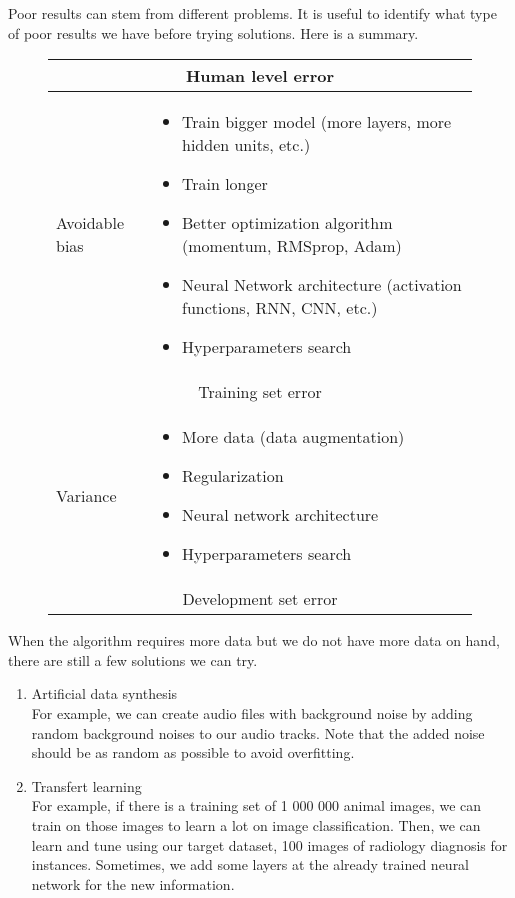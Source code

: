 Poor results can stem from different problems.
It is useful to identify what type of poor results we have before trying solutions.
Here is a summary.

\begin{figure}[h]
	\centering
	\renewcommand{\arraystretch}{1.5}
	\begin{tabular}{ll}
		\hline
		\multicolumn{2}{c}{Human level error} \\\hline
		Avoidable bias & 
		\begin{minipage}{0.85\textwidth}
			\begin{itemize}
				\item Train bigger model (more layers, more hidden units, etc.) 
				\item Train longer
				\item Better optimization algorithm (momentum, RMSprop, Adam)
				\item Neural Network architecture (activation functions, RNN, CNN, etc.)
				\item Hyperparameters search
			\end{itemize}
		\end{minipage}
		\\ \hline
		\multicolumn{2}{c}{Training set error} \\ \hline
		Variance & 
		\begin{minipage}{0.85\textwidth}
			\begin{itemize}
				\item More data (data augmentation) 
				\item Regularization
				\item Neural network architecture
				\item Hyperparameters search
			\end{itemize}
		\end{minipage}
		\\ \hline
		\multicolumn{2}{c}{Development set error } \\ \hline
	\end{tabular}
\end{figure}

When the algorithm requires more data but we do not have more data on hand, there are still a few solutions we can try.

\begin{enumerate}
	\item Artificial data synthesis \\
	For example, we can create audio files with background noise by adding random background noises to our audio tracks.
	Note that the added noise should be as random as possible to avoid overfitting.
	
	\item Transfert learning \\
	For example, if there is a training set of 1 000 000 animal images, we can train on those images to
	learn a lot on image classification.
	Then, we can learn and tune using our target dataset, 100 images of radiology diagnosis for instances.
	Sometimes, we add some layers at the already trained neural network for the new information.
\end{enumerate}